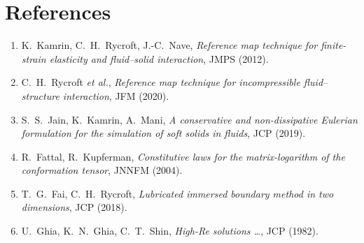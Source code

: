 \documentclass[11pt]{article}
\begin{document}
\section*{References}
\begin{enumerate}[nosep]
  \item K.~Kamrin, C.~H.~Rycroft, J.-C.~Nave, \emph{Reference map technique for
  finite-strain elasticity and fluid--solid interaction}, JMPS (2012).
  \item C.~H.~Rycroft \emph{et al.}, \emph{Reference map technique for
  incompressible fluid--structure interaction}, JFM (2020).
  \item S.~S.~Jain, K.~Kamrin, A.~Mani, \emph{A conservative and non-dissipative
  Eulerian formulation for the simulation of soft solids in fluids}, JCP (2019).
  \item R.~Fattal, R.~Kupferman, \emph{Constitutive laws for the matrix-logarithm of
  the conformation tensor}, JNNFM (2004).
  \item T.~G.~Fai, C.~H.~Rycroft, \emph{Lubricated immersed boundary method in two
  dimensions}, JCP (2018).
  \item U.~Ghia, K.~N.~Ghia, C.~T.~Shin, \emph{High-Re solutions \dots}, JCP (1982).
\end{enumerate}
\end{document}
